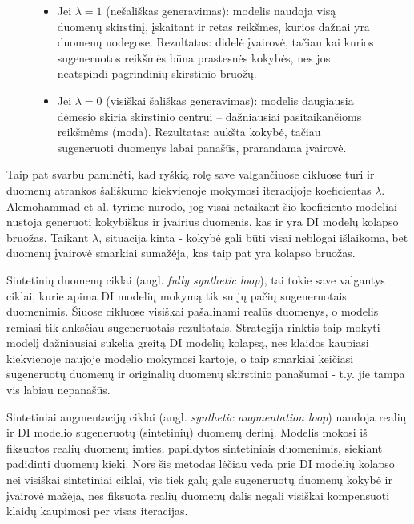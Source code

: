 \documentclass{VUMIFInfKursinis}
\begin{document}
\begin{figure}[H]
    \begin{itemize}
        \item Jei \textbf{\textcolor{raudona}{\(\lambda = 1 \)}} (nešališkas generavimas): modelis naudoja visą duomenų skirstinį, įskaitant ir retas reikšmes, kurios dažnai yra duomenų uodegose. Rezultatas: didelė įvairovė, tačiau kai kurios sugeneruotos reikšmės būna prastesnės kokybės, nes jos neatspindi pagrindinių skirstinio bruožų.
        \item Jei \textbf{\textcolor{raudona}{\(\lambda = 0 \)}} (visiškai šališkas generavimas): modelis daugiausia dėmesio skiria skirstinio centrui – dažniausiai pasitaikančioms reikšmėms (moda). Rezultatas: aukšta kokybė, tačiau sugeneruoti duomenys labai panašūs, prarandama įvairovė.
    \end{itemize}
\end{figure}




Taip pat svarbu paminėti, kad ryškią rolę save valgančiuose cikluose turi ir duomenų atrankos šališkumo kiekvienoje mokymosi iteracijoje koeficientas \(\lambda \). Alemohammad et al. tyrime\cite{ModelsGoMAD} nurodo, jog visai netaikant šio koeficiento modeliai nustoja generuoti kokybiškus ir įvairius duomenis, kas ir yra DI modelų kolapso bruožas. Taikant \(\lambda\), situacija kinta - kokybė gali būti visai neblogai išlaikoma, bet duomenų įvairovė smarkiai sumažėja, kas taip pat yra kolapso bruožas. 


Sintetinių duomenų ciklai (angl. \textsl{fully synthetic loop}), tai tokie save valgantys ciklai, kurie apima DI modelių mokymą tik su jų pačių sugeneruotais duomenimis. Šiuose cikluose visiškai pašalinami realūs duomenys, o modelis remiasi tik anksčiau sugeneruotais rezultatais. Strategija rinktis taip mokyti modelį  dažniausiai sukelia greitą DI modelių kolapsą, nes klaidos kaupiasi kiekvienoje naujoje modelio mokymosi kartoje, o taip smarkiai keičiasi sugeneruotų duomenų ir originalių duomenų skirstinio panašumai - t.y. jie tampa vis labiau nepanašūs.



Sintetiniai augmentacijų ciklai (angl. \textsl{synthetic augmentation loop}) naudoja realių ir DI modelio sugeneruotų (sintetinių) duomenų derinį. Modelis mokosi iš fiksuotos realių duomenų imties, papildytos sintetiniais duomenimis, siekiant padidinti duomenų kiekį. Nors šis metodas lėčiau veda prie DI modelių kolapso nei visiškai sintetiniai ciklai, vis tiek galų gale sugeneruotų duomenų kokybė ir įvairovė mažėja, nes fiksuota realių duomenų dalis negali visiškai kompensuoti klaidų kaupimosi per visas iteracijas.
\end{document}
